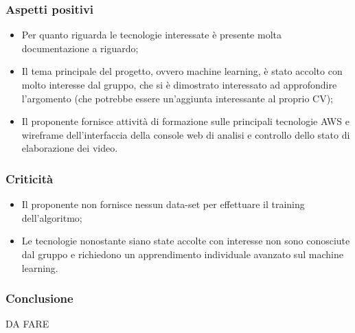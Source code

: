     \subsubsection{Aspetti positivi}
    \begin{itemize}
    		\item Per quanto riguarda le tecnologie interessate è presente molta documentazione a riguardo;	
    		\item Il tema principale del progetto, ovvero machine learning, è stato accolto con molto interesse dal gruppo, che si è dimostrato interessato ad approfondire l'argomento (che potrebbe essere un'aggiunta interessante al proprio CV);
    		 \item Il proponente fornisce attività di formazione sulle principali tecnologie AWS e wireframe dell'interfaccia della console web di analisi e controllo dello stato di elaborazione dei video.
    \end{itemize}
    \subsubsection{Criticità}
    \begin{itemize}
    		\item Il proponente non fornisce nessun data-set per effettuare il training dell'algoritmo;
    		\item  Le tecnologie nonostante siano state accolte con interesse non sono conosciute dal gruppo e  richiedono un apprendimento individuale avanzato sul machine learning.
    \end{itemize}
    
    \subsubsection{Conclusione}
	DA FARE 